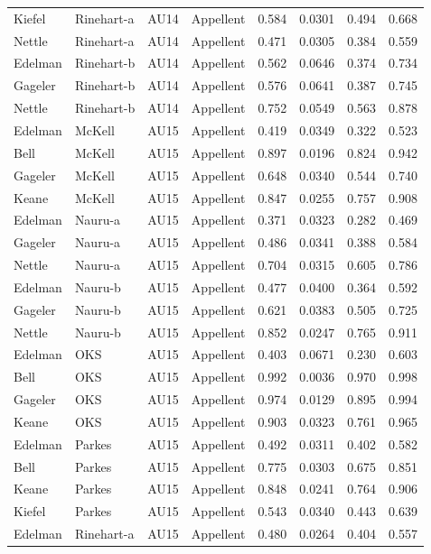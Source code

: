 \documentclass{monashthesis}
\begin{document}
\begin{center}
\begin{longtable}{llllllll}
Kiefel & Rinehart-a & AU14 & Appellent & 0.584 & 0.0301 & 0.494 & 0.668 \\
Nettle & Rinehart-a & AU14 & Appellent & 0.471 & 0.0305 & 0.384 & 0.559 \\
Edelman & Rinehart-b & AU14 & Appellent & 0.562 & 0.0646 & 0.374 & 0.734 \\
Gageler & Rinehart-b & AU14 & Appellent & 0.576 & 0.0641 & 0.387 & 0.745 \\
Nettle & Rinehart-b & AU14 & Appellent & 0.752 & 0.0549 & 0.563 & 0.878 \\
Edelman & McKell & AU15 & Appellent & 0.419 & 0.0349 & 0.322 & 0.523 \\
Bell & McKell & AU15 & Appellent & 0.897 & 0.0196 & 0.824 & 0.942 \\
Gageler & McKell & AU15 & Appellent & 0.648 & 0.0340 & 0.544 & 0.740 \\
Keane & McKell & AU15 & Appellent & 0.847 & 0.0255 & 0.757 & 0.908 \\
Edelman & Nauru-a & AU15 & Appellent & 0.371 & 0.0323 & 0.282 & 0.469 \\
Gageler & Nauru-a & AU15 & Appellent & 0.486 & 0.0341 & 0.388 & 0.584 \\
Nettle & Nauru-a & AU15 & Appellent & 0.704 & 0.0315 & 0.605 & 0.786 \\
Edelman & Nauru-b & AU15 & Appellent & 0.477 & 0.0400 & 0.364 & 0.592 \\
Gageler & Nauru-b & AU15 & Appellent & 0.621 & 0.0383 & 0.505 & 0.725 \\
Nettle & Nauru-b & AU15 & Appellent & 0.852 & 0.0247 & 0.765 & 0.911 \\
Edelman & OKS & AU15 & Appellent & 0.403 & 0.0671 & 0.230 & 0.603 \\
Bell & OKS & AU15 & Appellent & 0.992 & 0.0036 & 0.970 & 0.998 \\
Gageler & OKS & AU15 & Appellent & 0.974 & 0.0129 & 0.895 & 0.994 \\
Keane & OKS & AU15 & Appellent & 0.903 & 0.0323 & 0.761 & 0.965 \\
Edelman & Parkes & AU15 & Appellent & 0.492 & 0.0311 & 0.402 & 0.582 \\
Bell & Parkes & AU15 & Appellent & 0.775 & 0.0303 & 0.675 & 0.851 \\
Keane & Parkes & AU15 & Appellent & 0.848 & 0.0241 & 0.764 & 0.906 \\
Kiefel & Parkes & AU15 & Appellent & 0.543 & 0.0340 & 0.443 & 0.639 \\
Edelman & Rinehart-a & AU15 & Appellent & 0.480 & 0.0264 & 0.404 & 0.557 \\

\end{longtable}
\end{center}
\end{document}
